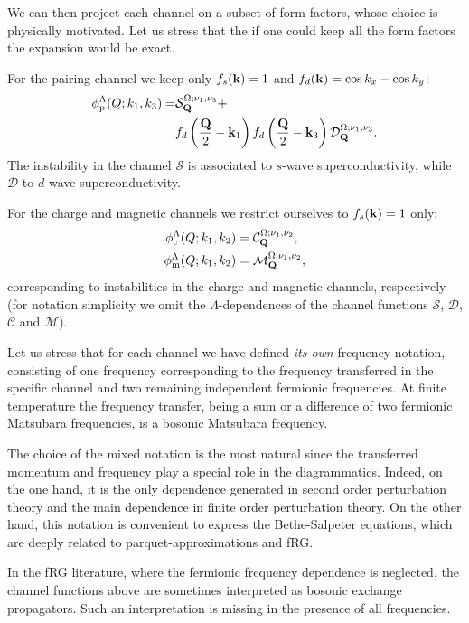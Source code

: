 We can then project each channel on a subset of form factors, whose choice is physically motivated\cite{Husemann2009}. 
Let us stress that the if one could keep all the  form factors the expansion would be exact.

For the pairing channel we keep only $f_{s}(\mathbf{k}) = 1$ and $f_d(\mathbf{k})=\cos{k_x} - \cos{k_y}$:
\begin{align}
\nonumber
  \phi^{\Lambda}_{\mathrm{p}}(Q;k_1,k_3) =&
    \mathcal{S}_{\mathbf{Q}}^{\Omega;\nu_1,\nu_3} +   \\ 
    & f_d\left(\frac{\mathbf{Q}}{2}-\mathbf{k}_1\right) f_d\left(\frac{\mathbf{Q}}{2}-\mathbf{k}_3\right) \mathcal{D}_{\mathbf{Q}}^{\Omega;\nu_1,\nu_3}.
\end{align}
The instability in the channel $\mathcal{S}$ is associated to $s$-wave superconductivity, while $\mathcal{D}$  to $d$-wave superconductivity.

For the charge and magnetic channels we restrict ourselves to $f_{s}(\mathbf{k})=1$ only:
\begin{align}
  \phi^\Lambda_{\mathrm{c}}(Q;k_1,k_2) &= \mathcal{C}_{\mathbf{Q}}^{\Omega;\nu_1,\nu_2}, \\
  \phi^\Lambda_{\mathrm{m}}(Q;k_1,k_2) &= \mathcal{M}_{\mathbf{Q}}^{\Omega;\nu_1,\nu_2},
\end{align}
corresponding to instabilities in the charge and magnetic channels, respectively (for notation simplicity we omit 
the $\Lambda$-dependences of the channel functions $\mathcal{S}$, $\mathcal{D}$, $\mathcal{C}$ and $\mathcal{M}$).

Let us stress that for each channel we have defined \textit{its own} frequency notation, consisting of one frequency corresponding to the frequency transferred in the specific channel 
and two remaining independent fermionic frequencies. 
 At finite temperature the frequency transfer, being a sum or a difference of 
two fermionic Matsubara frequencies, is a bosonic Matsubara frequency.

\noindent
The choice of the mixed notation is the most natural\cite{Wentzell2017} since the transferred momentum and 
frequency play a special role in the diagrammatics.
Indeed, on the one hand, it is the only dependence generated in second order perturbation theory and the main dependence in finite 
order perturbation theory. On the other hand, this notation is convenient to express the Bethe-Salpeter equations\cite{Rohringer2012}, which are deeply related to parquet-approximations and fRG. 

In the fRG literature\cite{Husemann2009,Husemann2012,Giering2012}, where the fermionic frequency dependence is neglected, the channel functions above are sometimes interpreted as bosonic exchange propagators. Such an interpretation is missing in the presence of all frequencies.

